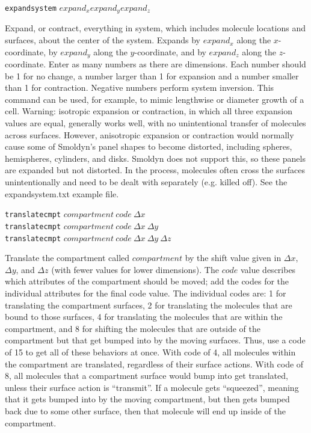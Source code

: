 \documentclass {scrbook}
\newcommand {\ttt} {\texttt}
\begin{document}
\begin{description}
\item{\ttt{expandsystem} $expand_x expand_y expand_z$}

Expand, or contract, everything in system, which includes molecule locations and surfaces, about the center of the system. Expands by $expand_x$ along the $x$-coordinate, by $expand_y$ along the $y$-coordinate, and by $expand_z$ along the $z$-coordinate. Enter as many numbers as there are dimensions. Each number should be 1 for no change, a number larger than 1 for expansion and a number smaller than 1 for contraction. Negative numbers perform system inversion. This command can be used, for example, to mimic lengthwise or diameter growth of a cell. Warning: isotropic expansion or contraction, in which all three expansion values are equal, generally works well, with no unintentional transfer of molecules across surfaces. However, anisotropic expansion or contraction would normally cause some of Smoldyn's panel shapes to become distorted, including spheres, hemispheres, cylinders, and disks. Smoldyn does not support this, so these panels are expanded but not distorted. In the process, molecules often cross the surfaces unintentionally and need to be dealt with separately (e.g. killed off). See the expandsystem.txt example file.

\item{\ttt{translatecmpt} $compartment\ code\ \Delta x$\\
\ttt{translatecmpt} $compartment\ code\ \Delta x\ \Delta y$\\
\ttt{translatecmpt} $compartment\ code\ \Delta x\ \Delta y\ \Delta z$}

Translate the compartment called $compartment$ by the shift value given in $\Delta x$, $\Delta y$, and $\Delta z$ (with fewer values for lower dimensions). The $code$ value describes which attributes of the compartment should be moved; add the codes for the individual attributes for the final code value. The individual codes are: 1 for translating the compartment surfaces, 2 for translating the molecules that are bound to those surfaces, 4 for translating the molecules that are within the compartment, and 8 for shifting the molecules that are outside of the compartment but that get bumped into by the moving surfaces. Thus, use a code of 15 to get all of these behaviors at once. With code of 4, all molecules within the compartment are translated, regardless of their surface actions. With code of 8, all molecules that a compartment surface would bump into get translated, unless their surface action is ``transmit''. If a molecule gets ``squeezed'', meaning that it gets bumped into by the moving compartment, but then gets bumped back due to some other surface, then that molecule will end up inside of the compartment.


\end{description}
\end{document}
